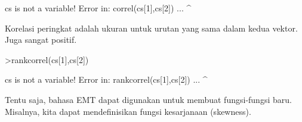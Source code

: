 \documentclass[a4paper,10pt]{article}
\begin{document}
\begin{eulernotebook}
\begin{euleroutput}
  cs is not a variable!
  Error in:
  correl(cs[1],cs[2]) ...
              ^
\end{euleroutput}
\begin{eulercomment}
Korelasi peringkat adalah ukuran untuk urutan yang sama dalam kedua
vektor. Juga sangat positif.
\end{eulercomment}
\begin{eulerprompt}
>rankcorrel(cs[1],cs[2])
\end{eulerprompt}
\begin{euleroutput}
  cs is not a variable!
  Error in:
  rankcorrel(cs[1],cs[2]) ...
                  ^
\end{euleroutput}
\begin{eulercomment}
Tentu saja, bahasa EMT dapat digunakan untuk membuat fungsi-fungsi
baru. Misalnya, kita dapat mendefinisikan fungsi kesarjanaan
(skewness).


\end{eulercomment}
\end{eulernotebook}
\end{document}
